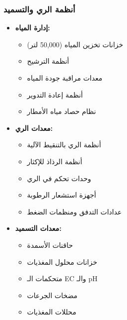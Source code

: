 \subsubsection{أنظمة الري والتسميد}
\begin{itemize}
    \item \textbf{إدارة المياه:}
    \begin{itemize}
        \item خزانات تخزين المياه (50,000 لتر)
        \item أنظمة الترشيح
        \item معدات مراقبة جودة المياه
        \item أنظمة إعادة التدوير
        \item نظام حصاد مياه الأمطار
    \end{itemize}
    
    \item \textbf{معدات الري:}
    \begin{itemize}
        \item أنظمة الري بالتنقيط الآلية
        \item أنظمة الرذاذ للإكثار
        \item وحدات تحكم في الري
        \item أجهزة استشعار الرطوبة
        \item عدادات التدفق ومنظمات الضغط
    \end{itemize}
    
    \item \textbf{معدات التسميد:}
    \begin{itemize}
        \item حاقنات الأسمدة
        \item خزانات محلول المغذيات
        \item متحكمات الـ EC والـ pH
        \item مضخات الجرعات
        \item محللات المغذيات
    \end{itemize}
\end{itemize}

